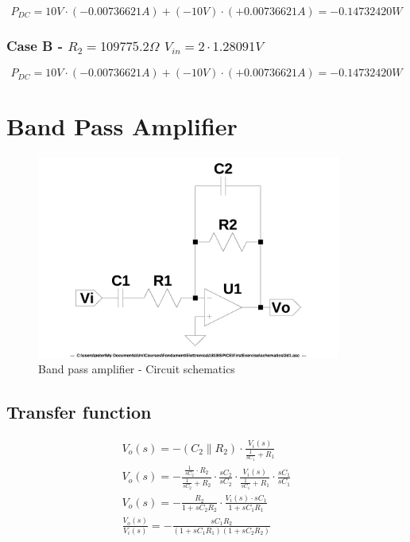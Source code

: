 \documentclass[10pt,a4paper]{article}
\begin{document}
$$P_{DC} = 10V \cdot (-0.00736621A) + (-10V) \cdot (+0.00736621 A) = -0.14732420W$$

\subsubsection{Case B - $R_2 = 109775.2\Omega$ $V_{in} = 2 \cdot 1.28091V$}


$$P_{DC} = 10V \cdot (-0.00736621A) + (-10V) \cdot (+0.00736621 A) = -0.14732420W$$

\section{Band Pass Amplifier}

\begin{figure}[H]
  \centering
  \includegraphics[width=10cm]{schematics/2d1.jpg}
  \caption{Band pass amplifier - Circuit schematics}
  \label{2d1schematics}
\end{figure}

\subsection{Transfer function}

\begin{align}
  V_o(s) = - (C_2 \parallel R_2) \cdot \frac{V_i(s)}{\frac{1}{sC_1}+R_1} \nonumber \\
  V_o(s) = - \frac{\frac{1}{sC_2} \cdot R_2}{\frac{1}{sC_2}+R_2} \cdot \frac{sC_2}{sC_2} \cdot \frac{V_i(s)}{\frac{1}{sC_1}+R_1} \cdot \frac{sC_1}{sC_1} \nonumber \\
  V_o(s) = - \frac{R_2}{1+sC_2R_2} \cdot \frac{V_i(s) \cdot sC_1}{1+sC_1R_1} \nonumber \\
  \frac{V_o(s)}{V_i(s)} = - \frac{sC_1R_2}{(1+sC_1R_1)(1+sC_2R_2)}
\end{align}
\end{document}
